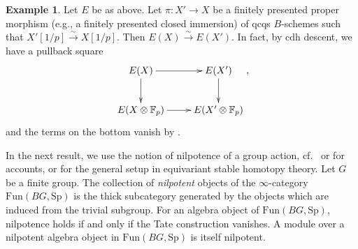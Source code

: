 \documentclass{amsart}
\renewcommand{\sp}{\mathrm{Sp}}
\theoremstyle{definition}
\newcommand{\fun}{\mathrm{Fun}}
\newtheorem{example}[theorem]{Example}
\begin{document}
\begin{example} 
\label{rigidgenericfiberproper}
Let $E$ be as above. 
Let $\pi\colon  X'  \to  X$ be a finitely presented proper morphism (e.g., a
finitely presented closed immersion) of qcqs $B$-schemes such that
$X'[1/p] \xrightarrow{\sim} X[1/p]$. Then 
$E(X)  \xrightarrow{\sim}  E(X')$. 
In fact, 
by cdh descent, we have a pullback square
\[ \xymatrix{
E(X) \ar[d] \ar[r] &  E(X') \ar[d]  \\
E(X \otimes \mathbb{F}_p) \ar[r] &  E(X' \otimes \mathbb{F}_p)
},\]
and the terms on the bottom vanish 
by 
. 
\end{example} 


In the next result, we use the notion of nilpotence of a group action,
cf.~\cite[Sec.~4.1]{Examples} or \cite[Def.~2.17]{CM19} for accounts, or
\cite{MNN17} for the general setup in equivariant stable homotopy theory. 
Let $G$ be a finite group. 
The collection of \emph{nilpotent} objects of the $\infty$-category $\fun(BG,
\sp)$ is the thick subcategory generated by the objects which are induced from
the trivial subgroup. For an algebra object of $\fun(BG, \sp)$, nilpotence
holds if and only if the Tate construction vanishes. 
A module over a nilpotent algebra object in $\fun(BG, \sp)$ is itself nilpotent. 
\end{document}
